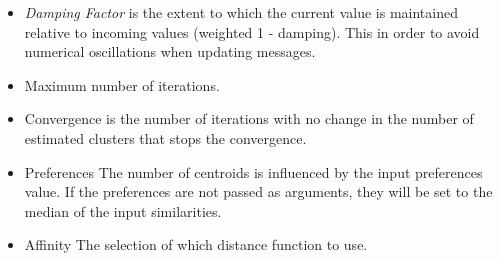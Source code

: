 \documentclass[../UNBThesis2.tex]{subfiles}
\begin{document}
\begin{itemize}

\item \textit{Damping Factor} is the extent to which the current value is maintained relative to incoming values (weighted 1 - damping). This in order to avoid numerical oscillations when updating messages.

\item Maximum number of iterations.

\item Convergence is the number of iterations with no change in the number of estimated clusters that stops the convergence.

\item Preferences The number of centroids is influenced by the input preferences value. If the preferences are not passed as arguments, they will be set to the median of the input similarities.

\item Affinity The selection of which distance function to use.


\end{itemize}
\end{document}
